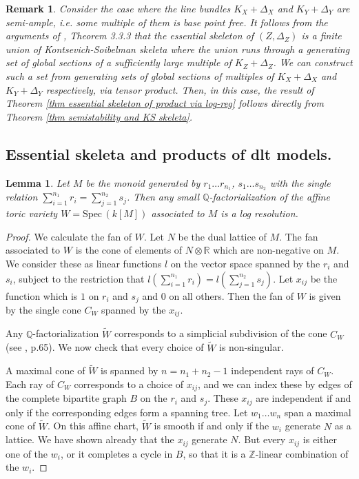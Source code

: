 \documentclass{amsart}%
\numberwithin{equation}{subsection}
\theoremstyle{plain2}
\newtheorem{lemma}[equation]{Lemma}
\theoremstyle{definition2}
\newtheorem{rem}[equation]{Remark}
\theoremstyle{stepstyle}
\theoremstyle{point}
\theoremstyle{subpoint}
\newcommand{\Spec}{\ensuremath{\mathrm{Spec}\,}}
\begin{document}
\begin{rem}
Consider the case where the line bundles $K_X + \Delta_X$ and $K_Y + \Delta_Y$ are semi-ample, i.e. some multiple of them is base point free. It follows from the arguments of \cite{NicaiseXu}, Theorem 3.3.3 that the essential skeleton of $(Z,\Delta_Z)$ is a finite union of Kontsevich-Soibelman skeleta where the union runs through a generating set of global sections of a sufficiently large multiple of $K_Z+\Delta_Z$. We can construct such a set from generating sets of global sections of multiples of $K_X + \Delta_X$ and $K_Y+ \Delta_Y$ respectively, via tensor product. Then, in this case, the result of Theorem \ref{thm essential skeleton of product via log-reg} follows directly from Theorem \ref{thm semistability and KS skeleta}.
\end{rem}


\subsection{Essential skeleta and products of dlt models.}

\begin{lemma}\label{smalltoric}
Let $M$ be the monoid generated by $r_1 \ldots r_{n_1}$, $s_1 \ldots s_{n_2}$ with the single relation $\sum_{i=1}^{n_1} r_i = \sum_{j=1}^{n_2} s_j$. Then any small $\mathbb{Q}$-factorialization of the affine toric variety $W=\Spec(k[M])$ associated to $M$ is a log resolution.
\end{lemma}

\begin{proof}
We calculate the fan of $W$. Let $N$ be the dual lattice of $M$. The fan associated to $W$ is the cone of elements of $N\otimes \mathbb{R}$ which are non-negative on $M$. We consider these as linear functions $l$ on the vector space spanned by the $r_i$ and $s_i$, subject to the restriction that $l(\sum_{i=1}^{n_1} r_i)=l( \sum_{j=1}^{n_2} s_j)$. Let $x_{ij}$ be the function which is $1$ on $r_i$ and $s_j$ and $0$ on all others. Then the fan of $W$ is given by the single cone $C_W$ spanned by the $x_{ij}$.

Any $\mathbb{Q}$-factorialization $\widetilde{W}$ corresponds to a simplicial subdivision of the cone $C_W$ (see \cite{Fulton1993}, p.65). We now check that every choice of $\widetilde{W}$ is non-singular.

A maximal cone of $\widetilde{W}$ is spanned by $n=n_1+n_2-1$ independent rays of $C_W$. Each ray of $C_W$ corresponds to a choice of $x_{ij}$, and we can index these by edges of the complete bipartite graph $B$ on the $r_i$ and $s_j$. These $x_{ij}$ are independent if and only if the corresponding edges form a spanning tree. Let $w_1 \ldots w_{n}$ span a maximal cone of $\widetilde{W}$. On this affine chart, $\widetilde{W}$ is smooth if and only if the $w_i$ generate $N$ as a lattice. We have shown already that the $x_{ij}$ generate $N$. But every $x_{ij}$ is either one of the $w_i$, or it completes a cycle in $B$, so that it is a $\mathbb{Z}$-linear combination of the $w_i$.
\end{proof}
\end{document}
